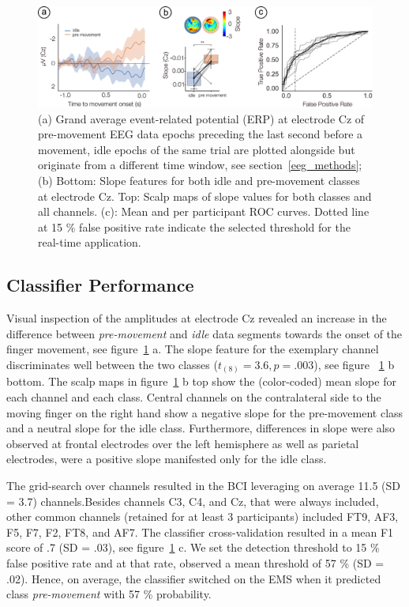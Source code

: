 \begin{figure}
    \centering
    \includegraphics[width=\textwidth]{figures/eeg_results.pdf}
    \caption{(a) Grand average event-related potential (ERP) at electrode Cz of pre-movement EEG data epochs preceding the last second before a movement, idle epochs of the same trial are plotted alongside but originate from a different time window, see section~\ref{eeg_methods}; (b) Bottom: Slope features for both idle and pre-movement classes at electrode Cz. Top: Scalp maps of slope values for both classes and all channels. (c): Mean and per participant ROC curves. Dotted line at 15 \% false positive rate indicate the selected threshold for the real-time application.}
    \label{fig:EEG_results}
\end{figure}

\subsection{Classifier Performance}
Visual inspection of the amplitudes at electrode Cz revealed an increase in the difference between \textit{pre-movement} and \textit{idle} data segments towards the onset of the finger movement, see figure~\ref{fig:EEG_results} a. The slope feature for the exemplary channel discriminates well between the two classes (${t_{(8)}} = 3.6, p = .003$), see figure ~\ref{fig:EEG_results} b bottom. The scalp maps in figure~\ref{fig:EEG_results} b top show the (color-coded) mean slope for each channel and each class. Central channels on the contralateral side to the moving finger on the right hand show a negative slope for the pre-movement class and a neutral slope for the idle class. Furthermore, differences in slope were also observed at frontal electrodes over the left hemisphere as well as parietal electrodes, were a positive slope manifested only for the idle class. 

The grid-search over channels resulted in the BCI leveraging on average 11.5 (SD = 3.7) channels.Besides channels C3, C4, and Cz, that were always included, other common channels (retained for at least 3 participants) included FT9, AF3, F5, F7, F2, FT8, and AF7. The classifier cross-validation resulted in a mean F1 score of .7 (SD = .03), see figure~\ref{fig:EEG_results} c. We set the detection threshold to 15 \% false positive rate and at that rate, observed a mean threshold of 57 \% (SD = .02). Hence, on average, the classifier switched on the EMS when it predicted class \textit{pre-movement} with 57 \% probability.


